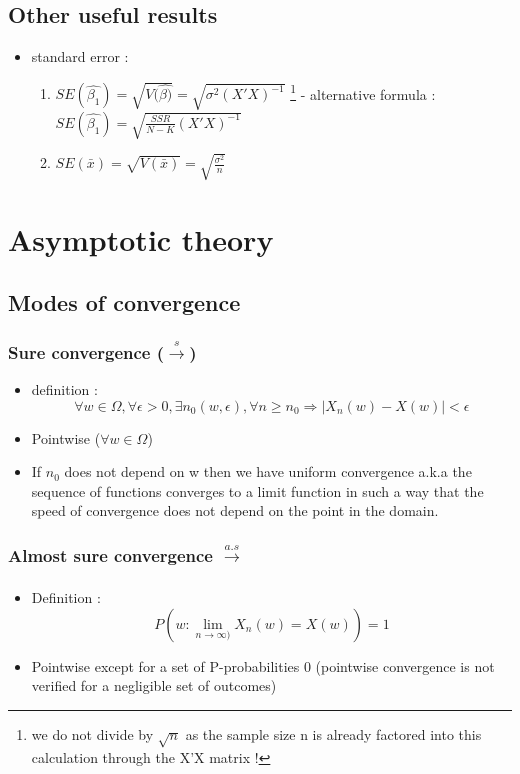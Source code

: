 \documentclass{article}
\begin{document}
\subsection{Other useful results}
\begin{itemize}
    \item standard error : 
    \begin{enumerate}
        \item $SE(\hat{\beta_1}) = \sqrt{V(\hat{\beta)}} = \sqrt{{\sigma}^2(X'X)^{-1}}$ \footnote{we do not divide by $\sqrt{n}$ as the sample size n is already factored into this calculation through the X'X matrix !} 
            \subitem - alternative formula : $SE(\hat{\beta_1})=\sqrt{\frac{SSR}{N-K}(X'X)^{-1}}$
        \item $SE(\bar{x}) = \sqrt{V(\bar{x})} = \sqrt{\frac{\sigma^2}{n}}$ 
    \end{enumerate}
\end{itemize}


\section{Asymptotic theory}
\subsection{Modes of convergence}
\subsubsection{Sure convergence ($\xrightarrow{s}$)}
\begin{itemize}
    \item definition : 
\begin{equation}
    \forall w\in\Omega, \forall\epsilon>0,\exists n_0(w,\epsilon),\forall n\geq n_0\Longrightarrow|X_n(w)-X(w)|<\epsilon
\end{equation}
    \item Pointwise ($\forall w\in\Omega$)
    \item If $n_0$ does not depend on w then we have uniform convergence a.k.a the sequence of functions converges to a limit function in such a way that the speed of convergence does not depend on the point in the domain.
\end{itemize}

\subsubsection{Almost sure convergence $\xrightarrow[]{a.s}$}
\begin{itemize}
    \item Definition :
    \begin{equation}
        P(w:\lim_{n\to\infty)}X_n(w)=X(w))=1
    \end{equation}
    \item Pointwise except for a set of P-probabilities 0 (pointwise convergence is not verified for a negligible set of outcomes)
\end{itemize}
\end{document}
